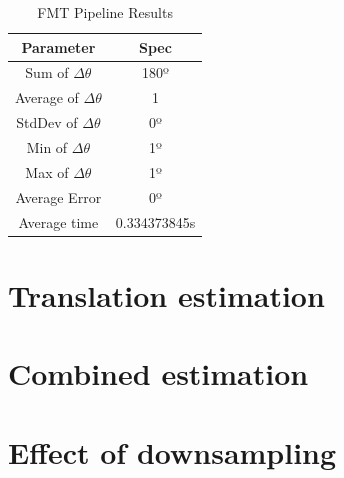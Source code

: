 \begin{table}[H]
    \centering
    \begin{tabular}{|c|c|}
        \hline
        \textbf{Parameter} & \textbf{Spec} \\ \hline
        Sum of $\Delta\theta$ & 180º \\ \hline
        Average of $\Delta\theta$ & 1 \\ \hline
        StdDev of $\Delta\theta$ & 0º \\ \hline
        Min of $\Delta\theta$ & 1º \\ \hline
        Max of $\Delta\theta$ & 1º \\ \hline
        Average Error & 0º \\ \hline
        Average time & 0.334373845s \\ \hline
    \end{tabular}
    \caption{FMT Pipeline Results}
\end{table}

\section{Translation estimation}

\section{Combined estimation}

\section{Effect of downsampling}